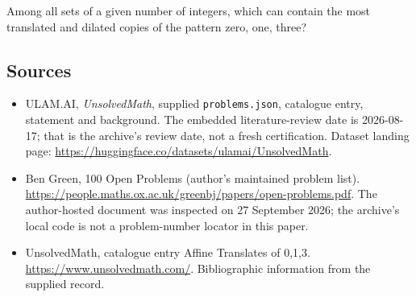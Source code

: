 \documentclass[11pt,a4paper]{article}
\begin{document}
Among all sets of a given number of integers, which can contain the most translated and dilated copies of the pattern zero, one, three?

\subsection{Sources}

{\small

\begin{itemize}

\item[\hypertarget{source:statement:1}{S1}] ULAM.AI, \emph{UnsolvedMath}, supplied \texttt{problems.json}, catalogue entry, statement and background. The embedded literature-review date is 2026-08-17; that is the archive’s review date, not a fresh certification. Dataset landing page: \url{https://huggingface.co/datasets/ulamai/UnsolvedMath}.

\item[\hypertarget{source:statement:2}{S2}] Ben Green, 100 Open Problems (author’s maintained problem list). \url{https://people.maths.ox.ac.uk/greenbj/papers/open-problems.pdf}. The author-hosted document was inspected on 27 September 2026; the archive’s local code is not a problem-number locator in this paper.

\item[\hypertarget{source:statement:3}{S3}] UnsolvedMath, catalogue entry Affine Translates of {0,1,3}. \url{https://www.unsolvedmath.com/}. Bibliographic information from the supplied record.

\end{itemize}

}

\label{end:statement}
\end{document}
